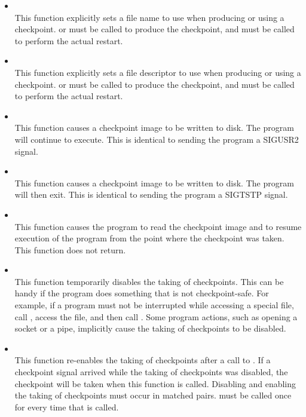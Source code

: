 \begin{itemize}

\item {}\\
This function explicitly sets a file name to use when
producing or using a checkpoint.
 or
 must be called to produce the
checkpoint, and
 must be called to perform the
actual restart.

\item {}\\
This function explicitly sets a file descriptor to use when
producing or using a checkpoint.
 or
 must be called to produce the
checkpoint, and
 must be called to perform the
actual restart.

\item {}\\
This function causes a checkpoint image to be written to disk.
The program will continue to execute.  This is identical to sending
the program a SIGUSR2 signal.

\item {}\\
This function causes a checkpoint image to be written to disk.
The program will then exit.  This is identical to sending the program
a SIGTSTP signal.

\item {}\\
This function causes the program to read the checkpoint
image and to resume
execution of the program from the point where the checkpoint
was taken.
This function does not return.

\item {}\\
This function temporarily disables the taking of checkpoints.  This can
be handy if the program does something that is not checkpoint-safe.
For example, if a program must not be interrupted while accessing
a special file, call , access the
file, and then call .  Some program
actions, such as opening a socket or a pipe, implicitly cause
the taking of checkpoints to be disabled.

\item {}\\
This function re-enables the taking of checkpoints after a call to
.  If a checkpoint signal arrived
while the taking of checkpoints was disabled, the checkpoint will be taken when
this function is called.  Disabling and enabling the taking of checkpoints
must occur in matched pairs.   must
be called once for every time that 
is called.


\end{itemize}
